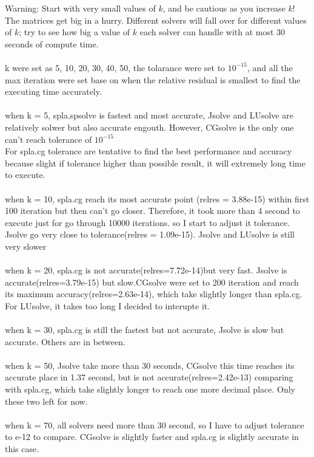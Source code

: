 \documentclass[11pt]{article}
\begin{document}
Warning: Start with very small values of $k$, and be cautious
as you increase $k$!
The matrices get big in a hurry.
Different solvers will fall over for different values of $k$;
try to see how big a value of $k$ each solver can handle with
at most 30 seconds of compute time. 
\\\\k were set as 5, 10, 20, 30, 40, 50, the tolarance were set to $10^{-15}$, and all the max iteration were set base on when the relative residual is smallest to find the executing time accurately.\\\\when k = 5, spla.spsolve is fastest and most accurate, Jsolve and LUsolve are relatively solwer but also accurate engouth. However, CGsolve is the only one can't reach tolerance of $10^{-15}$\\For spla.cg tolerance are tentative to find the best performance and accuracy because slight if tolerance higher than possible result, it will extremely long time to execute. 
\\\\when k = 10, spla.cg reach its most accurate point (relres = 3.88e-15) within first 100 iteration but then can't go closer. Therefore, it took more than 4 second to execute just for go through 10000 iterations. so I start to  adjust it tolerance. Jsolve go very close to tolerance(relres = 1.09e-15). Jsolve and LUsolve is still very slower
\\\\when k = 20, spla.cg is not accurate(relres=7.72e-14)but very fast. Jsolve is accurate(relres=3.79e-15) but slow.CGsolve were set to 200 iteration and reach its maximum accuracy(relres=2.63e-14), which take slightly longer than spla.cg. For LUsolve, it takes too long I decided to interupte it.\\\\
when k = 30, spla.cg is still the fastest but not accurate, Jsolve is slow but accurate. Others are in between.\\\\
when k = 50, Jsolve take more than 30 seconds, CGsolve this time reaches its accurate place in 1.37 second, but is not accurate(relres=2.42e-13) comparing with spla.cg, which take slightly longer to reach one more decimal place. Only these two left for now.\\\\
when k = 70, all solvers need more than 30 second, so I have to adjust tolerance to e-12 to compare. CGsolve is slightly faster and spla.cg is slightly accurate in this case.\\
\end{document}
